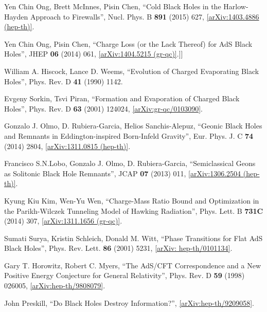 \documentclass[12pt]{article}
\newcommand{\2}{$^2$}
\newcommand{\3}{$^3$}
\newcommand{\4}{$_4$}
\newcommand{\5}{$_5$}
\newcommand{\x}{arXiv:}
\begin{document}
\begin{thebibliography}{400}
Yen Chin Ong, Brett McInnes, Pisin Chen, ``Cold Black Holes in the Harlow-Hayden Approach to Firewalls'', Nucl. Phys. B \textbf{891} (2015) 627, \href{http://arxiv.org/abs/1403.4886}{[arXiv:1403.4886 (hep-th)]}.

Yen Chin Ong, Pisin Chen, ``Charge Loss (or the Lack Thereof) for AdS Black Holes'', JHEP \textbf{06} (2014) 061, \href{http://arxiv.org/abs/1404.5215}{[arXiv:1404.5215 (gr-qc)]}.]]

William A. Hiscock, Lance D. Weems,
``Evolution of Charged Evaporating Black Holes'', Phys. Rev. D \textbf{41} (1990) 1142.

Evgeny Sorkin, Tsvi Piran,
``Formation and Evaporation of Charged Black Holes'', Phys. Rev. D \textbf{63} (2001) 124024, \href{http://arxiv.org/abs/gr-qc/0103090v1}{[arXiv:gr-qc/0103090]}.

Gonzalo J. Olmo, D. Rubiera-Garcia, Helios Sanchis-Alepuz, ``Geonic Black Holes and Remnants in Eddington-inspired Born-Infeld Gravity'', 	Eur. Phys. J. C \textbf{74} (2014) 2804, \href{http://arxiv.org/abs/1311.0815}{[arXiv:1311.0815 (hep-th)]}.

Francisco S.N.Lobo, Gonzalo J. Olmo, D. Rubiera-Garcia, ``Semiclassical Geons as Solitonic Black Hole Remnants'', JCAP \textbf{07} (2013) 011, \href{http://arxiv.org/abs/1306.2504}{[arXiv:1306.2504 (hep-th)]}.

Kyung Kiu Kim, Wen-Yu Wen, ``Charge-Mass Ratio Bound and Optimization in the Parikh-Wilczek Tunneling Model of Hawking Radiation'', Phys. Lett. B \textbf{731C} (2014) 307,  \href{http://arxiv.org/abs/1311.1656}{[arXiv:1311.1656 (gr-qc)]}.

Sumati Surya, Kristin Schleich, Donald M. Witt, ``Phase Transitions
for Flat AdS Black Holes'', Phys. Rev. Lett. \textbf{86} (2001) 5231, \href{http://arxiv.org/abs/hep-th/0101134}{[\x
hep-th/0101134]}.

Gary T. Horowitz, Robert C. Myers, ``The AdS/CFT Correspondence and a New Positive Energy Conjecture for General Relativity'',
Phys. Rev. D \textbf{59} (1998) 026005, \href{http://arxiv.org/abs/hep-th/9808079}{[\x hep-th/9808079]}.









John Preskill, ``Do Black Holes Destroy Information?'', \href{http://arxiv.org/abs/hep-th/9209058}{[arXiv:hep-th/9209058]}.


\end{thebibliography}
\end{document}
